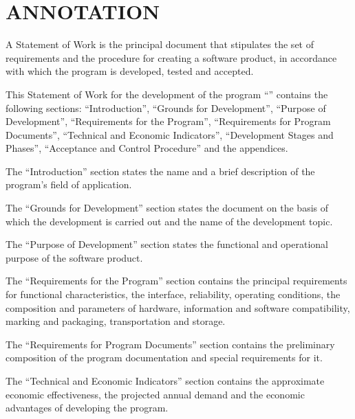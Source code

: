 \documentclass[12pt,a4paper]{extarticle}
\begin{document}
\sloppy




\section*{ANNOTATION}

A Statement of Work is the principal document that stipulates the set of requirements and the procedure for creating a software product, in accordance with which the program is developed, tested and accepted.

This Statement of Work for the development of the program \enquote{\hseProjectName} contains the following sections: \enquote{Introduction}, \enquote{Grounds for Development}, \enquote{Purpose of Development}, \enquote{Requirements for the Program}, \enquote{Requirements for Program Documents}, \enquote{Technical and Economic Indicators}, \enquote{Development Stages and Phases}, \enquote{Acceptance and Control Procedure} and the appendices\cite{gost19101}.

The \enquote{Introduction} section states the name and a brief description of the program's field of application.

The \enquote{Grounds for Development} section states the document on the basis of which the development is carried out and the name of the development topic.

The \enquote{Purpose of Development} section states the functional and operational purpose of the software product.

The \enquote{Requirements for the Program} section contains the principal requirements for functional characteristics, the interface, reliability, operating conditions, the composition and parameters of hardware, information and software compatibility, marking and packaging, transportation and storage.

The \enquote{Requirements for Program Documents} section contains the preliminary composition of the program documentation and special requirements for it.

The \enquote{Technical and Economic Indicators} section contains the approximate economic effectiveness, the projected annual demand and the economic advantages of developing the program.
\end{document}
